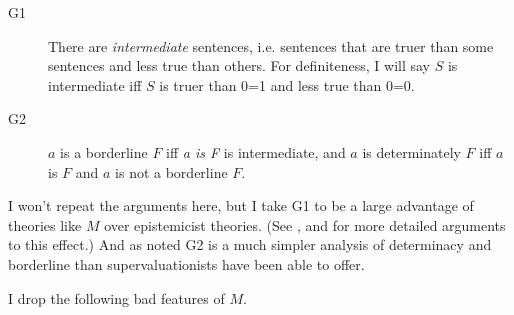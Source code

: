 \begin{description}
\item[G1] There are \textit{intermediate} sentences, i.e. sentences that are truer than some sentences and less true than others. For definiteness, I will say \(S\) is intermediate iff \(S\) is truer than 0=1 and less true than 0=0.
\item[G2] \(a\) is a borderline \(F\) iff \textit{a is F} is intermediate, and \(a\) is determinately \(F\) iff \(a\) is \(F\) and \(a\) is not a borderline \(F\).
\end{description}

\noindent I won't repeat the arguments here, but I take G1 to be a large advantage of theories like \(M\) over epistemicist theories. (See \citet{Burgess2001}, \citet{Sider2001} and \citet{Weatherson2003-WEAEPA} for more detailed arguments to this effect.) And as noted G2 is a much simpler analysis of determinacy and borderline than supervaluationists have been able to offer.

I drop the following bad features of \(M\).

